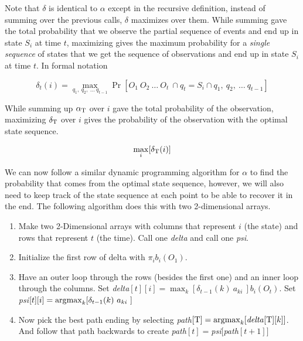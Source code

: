 Note that $\delta$ is identical to $\alpha$ except in the recursive
definition, instead of summing over the previous calls, $\delta$ maximizes
over them. While summing gave the total probability that we observe the
partial sequence of events and end up in state $S_i$ at time $t$,
maximizing gives the maximum probability for a \emph{single sequence} of
states that we get the sequence of observations and end up in state
$S_i$ at time $t$. In formal notation

\begin{equation}
  \delta_t(i) = \max_{q_1,\ q_2,\ \ldots\ q_{t-1}} \Pr[O_1\ O_2\ \ldots\
  O_t\ \cap q_t = S_i \cap q_1,\ q_2,\ \ldots\ q_{t-1}]
\end{equation}

While summing up $\alpha_{\mathrm{T}}$ over $i$ gave the total probability of the
observation, maximizing $\delta_{\mathrm{T}}$ over $i$ gives the probability of
the observation with the optimal state sequence. \cite{Rabiner89}

\begin{equation}
  \max_i[\delta_{\mathrm{T}}(i)]
\end{equation}

We can now follow a similar dynamic programming algorithm for $\alpha$ to
find the probability that comes from the optimal state sequence,
however, we will also need to keep track of the state sequence at each
point to be able to recover it in the end. The following algorithm does
this with two 2-dimensional arrays.

\begin{enumerate}
    \item Make two 2-Dimensional arrays with columns that
      represent $i$ (the state) and rows that represent $t$ (the time).
      Call one \emph{delta} and call one \emph{psi}.
    \item Initialize the first row of delta with $\pi_i b_i(O_1)$.
    \item Have an outer loop through the rows (besides the first one)
      and an inner loop through the columns. Set \emph{delta}$[t][i] =
      \max_k[\delta_{t-1}(k)\ a_{ki}\ ] b_i(O_t)$. Set \emph{psi}$[t][i]
      = \operatorname*{\arg\!\max}_k[\delta_{t-1}(k)\ a_{ki}\ ]$
    \item Now pick the best path ending by selecting \emph{path}$[\mathrm{T}] =
      \operatorname*{\arg\!\max}_k[\textrm{\emph{delta}}[\mathrm{T}][k]]$. And follow that path
      backwards to create \emph{path}$[t] =
      $\emph{psi}$[$\emph{path}$[t+1]]$
\end{enumerate}

